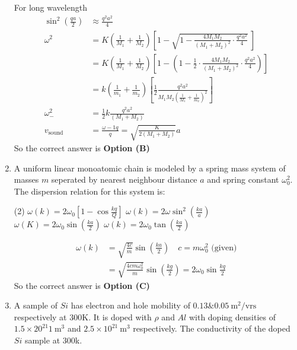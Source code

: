 \begin{enumerate}
\begin{answer}
	For long wavelength
	\begin{align*}
	\sin ^{2}\left(\frac{q a}{2}\right) &\approx \frac{q^{2} a^{2}}{4}\\
	\omega^{2}&=K\left(\frac{1}{M_{1}}+\frac{1}{M_{2}}\right)\left[1-\sqrt{1-\frac{4 M_{1} M_{2}}{\left(M_{1}+M_{2}\right)^{2}} \cdot \frac{q^{2} a^{2}}{4}}\ \right]\\
	&=K\left(\frac{1}{M_{1}}+\frac{1}{M_{2}}\right)\left[1-\left(1-\frac{1}{2} \cdot \frac{4 M_{1} M_{2}}{\left(M_{1}+M_{2}\right)^{2}} \cdot \frac{q^{2} a^{2}}{4}\right)\right]\\
	&=k\left(\frac{1}{m_{1}}+\frac{1}{m_{2}}\right)\left[\frac{1}{2} \frac{q^{2} a^{2}}{M_{1} M_{2}\left(\frac{1}{M_{1}}+\frac{1}{m_{2}}\right)^{2}}\right]\\
	\omega_{-}^{2}&=\frac{1}{2} k \frac{q^{2} a^{2}}{\left(M_{1}+M_{2}\right)}\\
	v_{\text {sound }}&=\frac{\omega-1 q}{q}=\sqrt{\frac{K}{2\left(M_{1}+M_{2}\right)}} a
	\end{align*}
	So the correct answer is \textbf{Option (B)}
\end{answer}
\item A uniform linear monoatomic chain is modeled by a spring mass system of masses $m$ seperated by nearest neighbour distance $a$ and spring constant $\omega_{0}^{2}$. The dispersion relation for this system is:
	\begin{tasks}(2)
		\task[\textbf{a.}]$\omega(k)=2 \omega_{0}\left[1-\cos \frac{k q}{Q}\right]$
		\task[\textbf{b.}]$\omega(k)=2 \omega \sin ^{2}\left(\frac{k a}{a}\right)$
		\task[\textbf{c.}]$\omega(K)=2 \omega_{0} \sin \left(\frac{k a}{2}\right)$
		\task[\textbf{d.}] $\omega(k)=2 \omega_{0} \tan \left(\frac{k a}{2}\right)$
	\end{tasks}
\begin{answer}
	\begin{align*}
	\omega(k)&=\sqrt{\frac{4 c}{m}} \sin \left(\frac{k a}{2}\right)\quad c=m \omega_{0}^{2}\text{ (given)}\\
	&=\sqrt{\frac{4 cm\omega^{2}_0}{m}} \sin \left(\frac{k g}{2}\right)=2 \omega_{0} \sin \frac{k q}{2}
	\end{align*}
	So the correct answer is \textbf{Option (C)}
\end{answer}
\item A sample of $Si$ has electron and hole mobility of $0.13 \& 0.05 \mathrm{~m}^{2} / \mathrm{vrs}$ respectively at $300 $K.  It is doped with $\rho$ and $Al$ with doping densities of $1.5 \times 20^{21} 1 \mathrm{~m}^{3}$ and $2.5 \times 10^{21} \mathrm{~m}^{3}$ respectively. The conductivity of the doped $Si$ sample at $300$k.

\end{enumerate}
